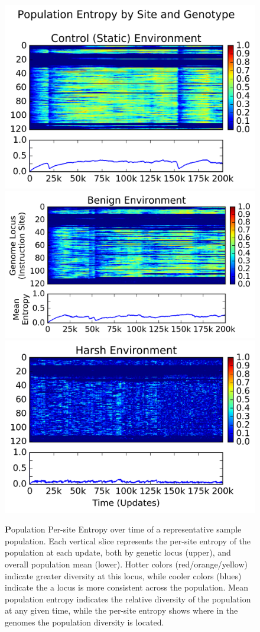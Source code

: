 \documentclass[PhD]{msu-thesis}
\begin{document}
\begin{figure}[!h]
\includegraphics[trim={-0.85cm 0 0.1cm 0.2cm},clip,width=0.5\columnwidth]{figures/CE/control__entropy}
\includegraphics[trim={0.25cm 0 0.1cm 0},clip,width=0.5\columnwidth]{figures/CE/benign__entropy}
\includegraphics[trim={-0.85cm 0 0.1cm 0},clip,width=1\columnwidth]{figures/CE/harsh__entropy}
\caption{{\textbf Population Per-site Entropy over time} of a representative sample population. Each vertical slice represents the per-site entropy of the population at each update, both by genetic locus (upper), and overall population mean (lower). Hotter colors (red/orange/yellow) indicate greater diversity at this locus, while cooler colors (blues) indicate the a locus is more consistent across the population. Mean population entropy indicates the relative diversity of the population at any given time, while the per-site entropy shows where in the genomes the population diversity is located.   %
}\label{fig:entropy}
\end{figure}
\end{document}
